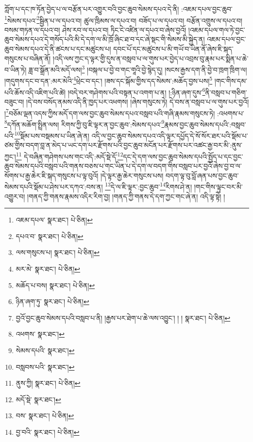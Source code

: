 ཀློག་པ་དང་ཁ་ཏོན་བྱེད་པ་ལ་བརྩོན་པར་འགྱུར་བའི་བྱང་ཆུབ་སེམས་དཔའ་དེ་ནི། :འཇམ་དཔལ་བྱང་ཆུབ་\footnote{འཇམ་དཔལ་  སྣར་ཐང་།  པེ་ཅིན། }སེམས་དཔའ་\footnote{དཔའ་བ་  སྣར་ཐང་།  པེ་ཅིན། }སྦྱིན་པ་ལ་དཔའ་བ། ཚུལ་ཁྲིམས་ལ་དཔའ་བ། བཟོད་པ་ལ་དཔའ་བ། བརྩོན་འགྲུས་ལ་དཔའ་བ། བསམ་གཏན་ལ་དཔའ་བ། ཤེས་རབ་ལ་དཔའ་བ། ཏིང་ངེ་འཛིན་ལ་དཔའ་བ་ཞེས་བྱའོ། །འཇམ་དཔལ་གལ་ཏེ་བྱང་ཆུབ་སེམས་དཔའ་དེ་གསོད་པའི་མི་དེ་དག་ལ་མི་ཁྲོ་ཞིང་ཐ་བ་དང་ཞེ་སྡང་གི་སེམས་མི་སྐྱེད་ན། འཇམ་དཔལ་བྱང་ཆུབ་སེམས་དཔའ་དེ་ནི་ཚངས་པ་དང་མཚུངས་པ། དབང་པོ་དང་མཚུངས་པ་མི་གཡོ་བ་ཡིན་ནོ་ཞེས་ཇི་སྐད་གསུངས་པ་བཞིན་ནོ། །འདི་ལས་ཀྱང་ད་ལྟར་གྱི་དུས་ན་བསླབ་པ་ལ་གུས་པར་བྱེད་པ་འབྲས་བུ་རྣམ་པར་སྨིན་པ་ཆེ་བ་ཡིན་ཏེ། ཟླ་བ་སྒྲོན་མའི་མདོ་ལས།\footnote{ལས་གསུངས་པ།  སྣར་ཐང་།  པེ་ཅིན། } །བསྐལ་པ་བྱེ་བ་གང་གཱའི་བྱེ་སྙེད་དུ། །སངས་རྒྱས་དག་ནི་བྱེ་བ་ཁྲག་ཁྲིག་ལ། །གདུགས་དང་བ་དན་:མར་མེའི་\footnote{མར་མེ་  སྣར་ཐང་།  པེ་ཅིན། }ཕྲེང་བ་དང་། །ཟས་དང་སྐོམ་གྱིས་དད་སེམས་:མཆོད་བྱས་པས།\footnote{མཆོད་པ་བས།  སྣར་ཐང་།  པེ་ཅིན། } །གང་གིས་དམ་པའི་ཆོས་འདི་འཇིག་པའི་ཚེ། །བདེ་བར་གཤེགས་པའི་བསྟན་པ་འགག་པ་ན། །:ཉིན་ཞག་དུས་\footnote{ཉིན་ཞག་ཏུ་  སྣར་ཐང་།  པེ་ཅིན། }ནི་བསླབ་པ་གཅིག་བཟུང་བ། །དེ་བས་བསོད་ནམས་འདི་ནི་ཁྱད་པར་འཕགས། །ཞེས་གསུངས་ཏེ། དེ་བས་ན་བསླབ་པ་ལ་གུས་པར་བྱའོ། །\footnote{བྱའོ་བྱང་ཆུབ་སེམས་དཔའི་བསླབ་པ་ནི། །རྒྱས་པར་ཐེག་པ་ཆེ་ལས་འབྱུང་། ། །  སྣར་ཐང་།  པེ་ཅིན། }བཅོམ་ལྡན་འདས་ཀྱིས་མདོ་དག་ལས་བྱང་ཆུབ་སེམས་དཔའ་བསླབ་པའི་གཞི་རྣམས་གསུངས་ཏེ། :འཕགས་པ་\footnote{འཕགས་  སྣར་ཐང་། }དཀོན་མཆོག་སྤྲིན་ལས། རིགས་ཀྱི་བུ་ཇི་ལྟར་ན་བྱང་ཆུབ་:སེམས་དཔའ་\footnote{སེམས་དཔའི་  སྣར་ཐང་། }རྣམས་བྱང་ཆུབ་སེམས་དཔའི་:བསླབ་པའི་\footnote{བསླབས་པའི་  སྣར་ཐང་། }སྡོམ་པས་བསྡམས་པ་ཡིན་ཞེ་ན། འདི་ལ་བྱང་ཆུབ་སེམས་དཔའ་འདི་ལྟར་དཔྱོད་དེ་སོ་སོར་ཐར་པའི་སྡོམ་པ་ཙམ་གྱིས་བདག་བླ་ན་མེད་པ་ཡང་དག་པར་རྫོགས་པའི་བྱང་ཆུབ་མངོན་པར་རྫོགས་པར་འཚང་རྒྱ་བར་མི་:ནུས་ཀྱང་།\footnote{ནུས་ཀྱི།  སྣར་ཐང་།  པེ་ཅིན། } དེ་བཞིན་གཤེགས་པས་གང་འདི་:མདོ་སྡེ་དོ་\footnote{མདོ་སྡེ་  སྣར་ཐང་། }དང་དེ་དག་ལས་བྱང་ཆུབ་སེམས་དཔའི་སྤྱོད་པ་དང་བྱང་ཆུབ་སེམས་དཔའི་བསླབ་པའི་གནས་བཅས་པ་གང་ཡིན་པ་དེ་དག་ལ་བདག་གིས་བསླབ་པར་བྱའོ་ཞེས་བྱ་བ་ལ་སོགས་པ་རྒྱ་ཆེར་ཇི་སྐད་གསུངས་པ་ལྟ་བུའོ། །དེ་ལྟར་རྒྱ་ཆེར་གསུངས་པས། བདག་ལྟ་བུ་བློ་ཞན་པས་བྱང་ཆུབ་སེམས་དཔའི་སྡོམ་པ་ཤེས་པར་དཀའ་:བས་ན། \footnote{བས་  སྣར་ཐང་།  པེ་ཅིན། }དེ་ལ་ཇི་ལྟར་:བྱང་ཆུབ་\footnote{བྱ་བའི་  སྣར་ཐང་།  པེ་ཅིན། }རིགས་ཤེ་ན། །གང་གིས་ལྟུང་བར་མི་འགྱུར་བ། །གནད་ཀྱི་གནས་རྣམས་འདིར་རིག་བྱ། །གནད་ཀྱི་གནས་དེ་དག་ཀྱང་གང་ཞེ་ན། འདི་ལྟ་སྟེ། །

